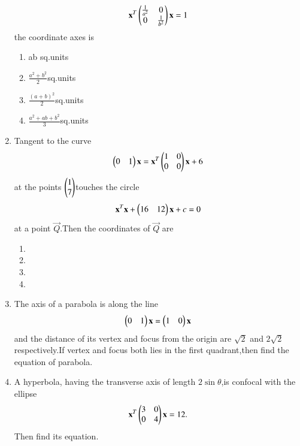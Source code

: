 \documentclass[journal,12pt,twocolumn]{IEEEtran}
\begin{document}
\begin{enumerate}[label=\arabic*]
    \begin{align}
    \mathbf {x}^T \begin{pmatrix}\frac{1}{a^2}& 0 \\0 & \frac{1}{b^2}\end{pmatrix} \mathbf{x}=1
    \end{align} the coordinate axes is 
    \begin{enumerate}
    \item ab sq.units
    \item $\frac{a^2+b^2}{2}$sq.units 
    \item $\frac{(a+b)^2}{2}$sq.units 
    \item $\frac{a^2+ab+b^2}{3}$sq.units
    \end{enumerate}
\item Tangent to the curve
    \begin{align}
    \begin{pmatrix}0&1\end{pmatrix}\mathbf{x}= \mathbf{x}^T\begin{pmatrix}1 & 0 \\0 & 0\end{pmatrix}\mathbf{x}+ 6
    \end{align} 
    at the points $\begin{pmatrix}1 \\ 7\end{pmatrix}$touches the circle 
    \begin{align}
    \mathbf{x}^T \mathbf{x}+\begin{pmatrix}16&12\end{pmatrix}\mathbf{x}+c=0
    \end{align}at a point $\vec{Q}$.Then the coordinates of $\vec{Q}$ are 
    \begin{enumerate}
    \item {}
    \item {}
    \item {}
    \item {}
    \end{enumerate}
    \item The axis of a parabola is along the line
    \begin{align}
    \begin{pmatrix}0&1\end{pmatrix}\mathbf{x}=\begin{pmatrix}1&0\end{pmatrix}\mathbf{x}
    \end{align} and the distance of its vertex and focus from the origin are $\sqrt{2}$ and 	 $2\sqrt{2}$ respectively.If vertex and focus both lies in the first quadrant,then find the equation of parabola.
    \item A hyperbola, having the transverse axis of length $2\sin\theta$,is confocal with the  	ellipse 
    \begin{align} 
    \mathbf{x}^T\begin{pmatrix}3&0\\0&4 \end{pmatrix}\mathbf{x}=12.
    \end{align}Then find its equation.

\end{enumerate}
\end{document}
